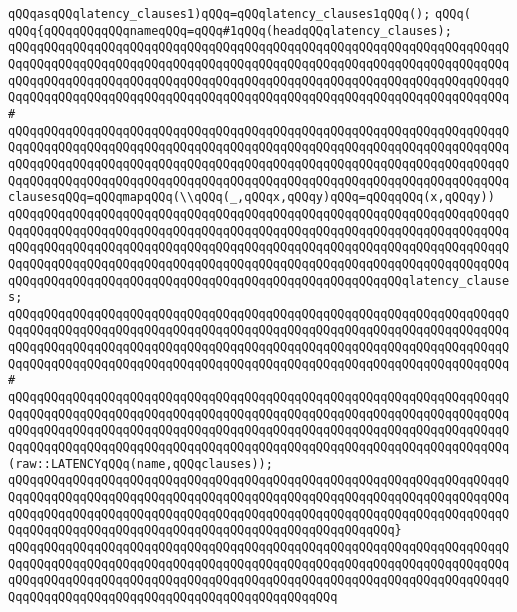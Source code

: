 \verb|qQQqasqQQqlatency_clauses1)qQQq=qQQqlatency_clauses1qQQq();|\newline
\verb|qQQq(|\newline
\verb|qQQq{qQQqqQQqqQQqnameqQQq=qQQq#1qQQq(headqQQqlatency_clauses);|\newline
\verb|qQQqqQQqqQQqqQQqqQQqqQQqqQQqqQQqqQQqqQQqqQQqqQQqqQQqqQQqqQQqqQQqqQQqqQQqqQQqqQQqqQQqqQQqqQQqqQQqqQQqqQQqqQQqqQQqqQQqqQQqqQQqqQQqqQQqqQQqqQQqqQQqqQQqqQQqqQQqqQQqqQQqqQQqqQQqqQQqqQQqqQQqqQQqqQQqqQQqqQQqqQQqqQQqqQQqqQQqqQQqqQQqqQQqqQQqqQQqqQQqqQQqqQQqqQQqqQQqqQQqqQQqqQQqqQQqqQQqqQQq#|\newline
\verb|qQQqqQQqqQQqqQQqqQQqqQQqqQQqqQQqqQQqqQQqqQQqqQQqqQQqqQQqqQQqqQQqqQQqqQQqqQQqqQQqqQQqqQQqqQQqqQQqqQQqqQQqqQQqqQQqqQQqqQQqqQQqqQQqqQQqqQQqqQQqqQQqqQQqqQQqqQQqqQQqqQQqqQQqqQQqqQQqqQQqqQQqqQQqqQQqqQQqqQQqqQQqqQQqqQQqqQQqqQQqqQQqqQQqqQQqqQQqqQQqqQQqqQQqqQQqqQQqqQQqqQQqqQQqqQQqqQQqqQQqclausesqQQq=qQQqmapqQQq(\\qQQq(_,qQQqx,qQQqy)qQQq=qQQqqQQq(x,qQQqy))|\newline
\verb|qQQqqQQqqQQqqQQqqQQqqQQqqQQqqQQqqQQqqQQqqQQqqQQqqQQqqQQqqQQqqQQqqQQqqQQqqQQqqQQqqQQqqQQqqQQqqQQqqQQqqQQqqQQqqQQqqQQqqQQqqQQqqQQqqQQqqQQqqQQqqQQqqQQqqQQqqQQqqQQqqQQqqQQqqQQqqQQqqQQqqQQqqQQqqQQqqQQqqQQqqQQqqQQqqQQqqQQqqQQqqQQqqQQqqQQqqQQqqQQqqQQqqQQqqQQqqQQqqQQqqQQqqQQqqQQqqQQqqQQqqQQqqQQqqQQqqQQqqQQqqQQqqQQqqQQqqQQqqQQqqQQqqQQqqQQqqQQqlatency_clauses;|\newline
\verb|qQQqqQQqqQQqqQQqqQQqqQQqqQQqqQQqqQQqqQQqqQQqqQQqqQQqqQQqqQQqqQQqqQQqqQQqqQQqqQQqqQQqqQQqqQQqqQQqqQQqqQQqqQQqqQQqqQQqqQQqqQQqqQQqqQQqqQQqqQQqqQQqqQQqqQQqqQQqqQQqqQQqqQQqqQQqqQQqqQQqqQQqqQQqqQQqqQQqqQQqqQQqqQQqqQQqqQQqqQQqqQQqqQQqqQQqqQQqqQQqqQQqqQQqqQQqqQQqqQQqqQQqqQQqqQQqqQQqqQQq#|\newline
\verb|qQQqqQQqqQQqqQQqqQQqqQQqqQQqqQQqqQQqqQQqqQQqqQQqqQQqqQQqqQQqqQQqqQQqqQQqqQQqqQQqqQQqqQQqqQQqqQQqqQQqqQQqqQQqqQQqqQQqqQQqqQQqqQQqqQQqqQQqqQQqqQQqqQQqqQQqqQQqqQQqqQQqqQQqqQQqqQQqqQQqqQQqqQQqqQQqqQQqqQQqqQQqqQQqqQQqqQQqqQQqqQQqqQQqqQQqqQQqqQQqqQQqqQQqqQQqqQQqqQQqqQQqqQQqqQQqqQQqqQQq(raw::LATENCYqQQq(name,qQQqclauses));|\newline
\verb|qQQqqQQqqQQqqQQqqQQqqQQqqQQqqQQqqQQqqQQqqQQqqQQqqQQqqQQqqQQqqQQqqQQqqQQqqQQqqQQqqQQqqQQqqQQqqQQqqQQqqQQqqQQqqQQqqQQqqQQqqQQqqQQqqQQqqQQqqQQqqQQqqQQqqQQqqQQqqQQqqQQqqQQqqQQqqQQqqQQqqQQqqQQqqQQqqQQqqQQqqQQqqQQqqQQqqQQqqQQqqQQqqQQqqQQqqQQqqQQqqQQqqQQqqQQqqQQqqQQqqQQq}|\newline
\verb|qQQqqQQqqQQqqQQqqQQqqQQqqQQqqQQqqQQqqQQqqQQqqQQqqQQqqQQqqQQqqQQqqQQqqQQqqQQqqQQqqQQqqQQqqQQqqQQqqQQqqQQqqQQqqQQqqQQqqQQqqQQqqQQqqQQqqQQqqQQqqQQqqQQqqQQqqQQqqQQqqQQqqQQqqQQqqQQqqQQqqQQqqQQqqQQqqQQqqQQqqQQqqQQqqQQqqQQqqQQqqQQqqQQqqQQqqQQqqQQqqQQqqQQqqQQqqQQq|\newline
